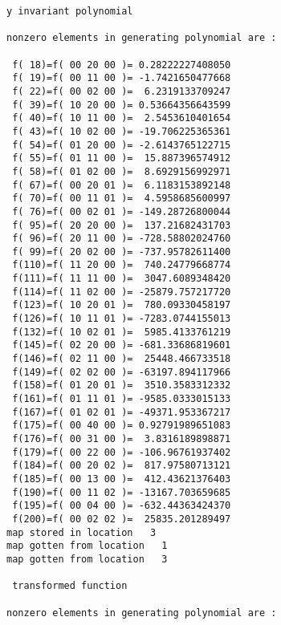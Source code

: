 \begin{footnotesize}
\begin{verbatim}
y invariant polynomial

nonzero elements in generating polynomial are :

 f( 18)=f( 00 20 00 )= 0.28222227408050
 f( 19)=f( 00 11 00 )= -1.7421650477668
 f( 22)=f( 00 02 00 )=  6.2319133709247
 f( 39)=f( 10 20 00 )= 0.53664356643599
 f( 40)=f( 10 11 00 )=  2.5453610401654
 f( 43)=f( 10 02 00 )= -19.706225365361
 f( 54)=f( 01 20 00 )= -2.6143765122715
 f( 55)=f( 01 11 00 )=  15.887396574912
 f( 58)=f( 01 02 00 )=  8.6929156992971
 f( 67)=f( 00 20 01 )=  6.1183153892148
 f( 70)=f( 00 11 01 )=  4.5958685600997
 f( 76)=f( 00 02 01 )= -149.28726800044
 f( 95)=f( 20 20 00 )=  137.21682431703
 f( 96)=f( 20 11 00 )= -728.58802024760
 f( 99)=f( 20 02 00 )= -737.95782611400
 f(110)=f( 11 20 00 )=  740.24779668774
 f(111)=f( 11 11 00 )=  3047.6089348420
 f(114)=f( 11 02 00 )= -25879.757217720
 f(123)=f( 10 20 01 )=  780.09330458197
 f(126)=f( 10 11 01 )= -7283.0744155013
 f(132)=f( 10 02 01 )=  5985.4133761219
 f(145)=f( 02 20 00 )= -681.33686819601
 f(146)=f( 02 11 00 )=  25448.466733518
 f(149)=f( 02 02 00 )= -63197.894117966
 f(158)=f( 01 20 01 )=  3510.3583312332
 f(161)=f( 01 11 01 )= -9585.0333015133
 f(167)=f( 01 02 01 )= -49371.953367217
 f(175)=f( 00 40 00 )= 0.92791989651083
 f(176)=f( 00 31 00 )=  3.8316189898871
 f(179)=f( 00 22 00 )= -106.96761937402
 f(184)=f( 00 20 02 )=  817.97580713121
 f(185)=f( 00 13 00 )=  412.43621376403
 f(190)=f( 00 11 02 )= -13167.703659685
 f(195)=f( 00 04 00 )= -632.44363424370
 f(200)=f( 00 02 02 )=  25835.201289497
map stored in location   3
map gotten from location   1
map gotten from location   3

 transformed function

nonzero elements in generating polynomial are :


\end{verbatim}
\end{footnotesize}
